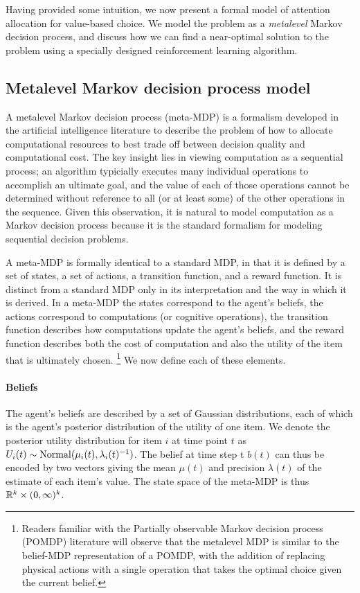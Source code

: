 \documentclass[12pt,a4paperpaper,]{article}
\begin{document}
Having provided some intuition, we now present a formal model of attention allocation for value-based choice. We model the problem as a \emph{metalevel} Markov decision process, and discuss how we can find a near-optimal solution to the problem using a specially designed reinforcement learning algorithm.

\subsection{Metalevel Markov decision process
model}

A metalevel Markov decision process (meta-MDP) is a formalism developed in the artificial intelligence literature to describe the problem of how to allocate computational resources to best trade off between decision quality and computational cost. The key insight lies in viewing computation as a sequential process; an algorithm typicially executes many individual operations to accomplish an ultimate goal, and the value of each of those operations cannot be determined without reference to all (or at least some) of the other operations in the sequence. Given this observation, it is natural to model computation as a Markov decision process because it is the standard formalism for modeling sequential decision problems.

A meta-MDP is formally identical to a standard MDP, in that it is defined by a set of states, a set of actions, a transition function, and a reward function. It is distinct from a standard MDP only in its interpretation and the way in which it is derived. In a meta-MDP the states correspond to the agent's beliefs, the actions correspond to computations (or cognitive operations), the transition function describes how computations update the agent's beliefs, and the reward function describes both the cost of computation and also the utility of the item that is ultimately chosen.%
  \footnote{Readers familiar with the Partially observable Markov decision process (POMDP) literature will observe that the metalevel MDP is similar to the belief-MDP representation of a POMDP, with the addition of replacing physical actions with a single operation that takes the optimal choice given the current belief.}
We now define each of these elements.


\paragraph{Beliefs}
The agent's beliefs are described by a set of Gaussian distributions, each of which is the agent's posterior distribution of the utility of one item. We denote the posterior utility distribution for item $i$ at time point $t$ as $U_i(t) \sim \mathrm{Normal}(\mu_i(t), \lambda_i(t)^{-1})$. The belief at time step t $b(t)$ can thus be encoded by two vectors giving the mean $\mu(t)$ and precision $\lambda(t)$ of the estimate of each item's value. The state space of the meta-MDP is thus $\mathbb{R}^k \times (0,\infty)^k$.
\end{document}
